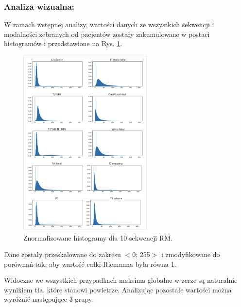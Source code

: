 \subsubsection{Analiza wizualna:} W ramach wstępnej analizy, wartości danych ze wszystkich sekwencji i modalności zebranych od pacjentów zostały zakumulowane w postaci  histogramów i przedstawione na Rys. \ref{fig:Hists}.
\begin{figure}[h]
	\centering
	\includegraphics[width=0.6\textwidth]{figures/Hists.jpg}
	\caption{Znormalizowane histogramy dla 10 sekwencji RM.}\label{fig:Hists}
\end{figure}
Dane zostały przeskalowane do zakresu $<$0; 255$>$ i zmodyfikowane do porównań tak, aby wartość całki Riemanna była równa 1.

Widoczne we wszystkich przypadkach maksima globalne w zerze są naturalnie wynikiem tła, które stanowi powietrze. Analizując pozostałe wartości można wyróżnić następujące 3 grupy:

